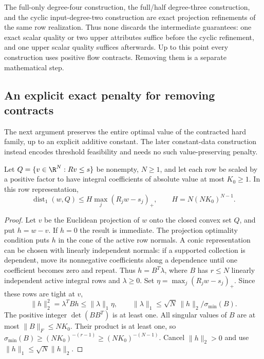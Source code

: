 The full-only degree-four construction, the full/half degree-three
construction, and the cyclic input-degree-two construction are exact
projection refinements of the same row realization. Thus none discards
the intermediate guarantees: one exact scalar quality or two upper
attributes suffice before the cyclic refinement, and one upper scalar
quality suffices afterwards. Up to this point every construction uses
positive flow contracts. Removing them is a separate mathematical step.

\subsection{An explicit exact penalty for removing contracts}\label{s3:penalty}

The next argument preserves the entire optimal value of the contracted
hard family, up to an explicit additive constant. The later constant-data
construction instead encodes threshold feasibility and needs no such
value-preserving penalty.

\begin{lemma}\label{s3:hoffman}
Let $Q=\{v\in\R^N:Rv\le s\}$ be nonempty, $N\ge1$, and let each row
be scaled by a positive factor to have integral coefficients of absolute
value at most $K_0\ge1$. In this row representation,
\begin{equation}
 \operatorname{dist}_1(w,Q)\le H\max_j(R_jw-s_j)_+,
 \qquad H=N(NK_0)^{N-1}.\label{s3:hoffman-bound}
\end{equation}
\end{lemma}
\begin{proof}
Let $v$ be the Euclidean projection of $w$ onto the closed convex set
$Q$, and put $h=w-v$. If $h=0$ the result is immediate. The projection
optimality condition puts $h$ in the cone of the active row normals.
A conic representation can be chosen with linearly independent normals:
if a supported collection is dependent, move its nonnegative coefficients
along a dependence until one coefficient becomes zero and repeat. Thus
$h=B^T\lambda$, where $B$ has $r\le N$ linearly independent active
integral rows and $\lambda\ge0$. Set
$\eta=\max_j(R_jw-s_j)_+$. Since these rows are tight at $v$,
\[
 \|h\|_2^2=\lambda^TBh\le\|\lambda\|_1\eta,
 \qquad
 \|\lambda\|_1\le\sqrt N\,\|h\|_2/\sigma_{\min}(B).
\]
The positive integer $\det(BB^T)$ is at least one. All singular values
of $B$ are at most $\|B\|_F\le NK_0$. Their product is at least one,
so $\sigma_{\min}(B)\ge(NK_0)^{-(r-1)}\ge(NK_0)^{-(N-1)}$.
Cancel $\|h\|_2>0$ and use $\|h\|_1\le\sqrt N\|h\|_2$.
\end{proof}

